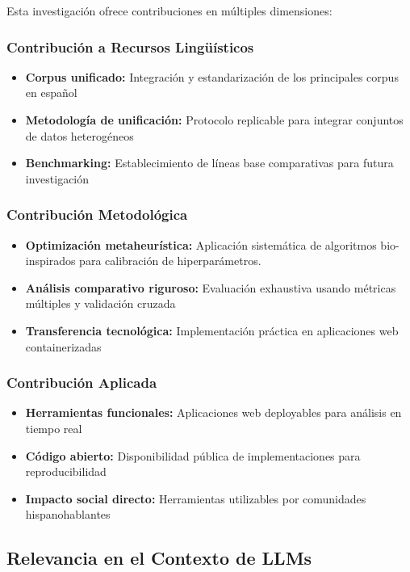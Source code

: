 Esta investigación ofrece contribuciones en múltiples dimensiones:

\subsubsection{Contribución a Recursos Lingüísticos}
\begin{itemize}
    \item \textbf{Corpus unificado:} Integración y estandarización de los principales corpus en español
    \item \textbf{Metodología de unificación:} Protocolo replicable para integrar conjuntos de datos heterogéneos
    \item \textbf{Benchmarking:} Establecimiento de líneas base comparativas para futura investigación
\end{itemize}

\subsubsection{Contribución Metodológica}
\begin{itemize}
    \item \textbf{Optimización metaheurística:} Aplicación sistemática de algoritmos bio-inspirados para calibración de hiperparámetros.
    \item \textbf{Análisis comparativo riguroso:} Evaluación exhaustiva usando métricas múltiples y validación cruzada
    \item \textbf{Transferencia tecnológica:} Implementación práctica en aplicaciones web containerizadas
\end{itemize}

\subsubsection{Contribución Aplicada}
\begin{itemize}
    \item \textbf{Herramientas funcionales:} Aplicaciones web deployables para análisis en tiempo real
    \item \textbf{Código abierto:} Disponibilidad pública de implementaciones para reproducibilidad
    \item \textbf{Impacto social directo:} Herramientas utilizables por comunidades hispanohablantes
\end{itemize}

\subsection{Relevancia en el Contexto de LLMs}

